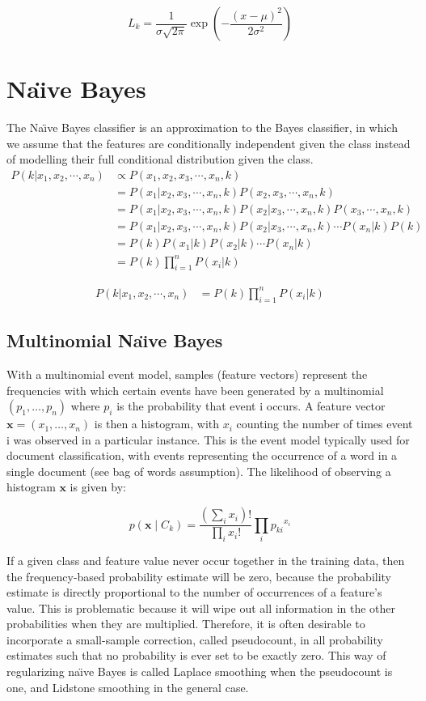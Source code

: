 \documentclass{article}
\begin{document}
\[
L_k = \frac{1}{\sigma\sqrt{2\pi}} \exp \left( -\frac{(x-\mu)^2}{2\sigma^2} \right)
\]

\section{Na\"{\i}ve Bayes}
The Na\"{\i}ve Bayes classifier is an approximation to the Bayes classifier, in which we assume that the features are conditionally independent given the class instead of modelling their full conditional distribution given the class.
\begin{align*} 
P(k|x_1,x_2,\cdots,x_n) &\propto  P(x_1,x_2,x_3,\cdots,x_n,k) \\ 
&=  P(x_1|x_2,x_3,\cdots,x_n,k)P(x_2,x_3,\cdots,x_n,k) \\ 
&= P(x_1|x_2,x_3,\cdots,x_n,k)P(x_2|x_3,\cdots,x_n,k)P(x_3,\cdots,x_n,k) \\
&=  P(x_1|x_2,x_3,\cdots,x_n,k)P(x_2|x_3,\cdots,x_n,k) \cdots P(x_n|k)P(k) \\ 
&=  P(k)P(x_1|k)P(x_2|k) \cdots P(x_n|k) \\
&=  P(k)\prod_{i=1}^{n} P(x_i|k)
\end{align*}

\begin{align*} 
P(k|x_1,x_2,\cdots,x_n) &= P(k)\prod_{i=1}^{n} P(x_i|k)
\end{align*}

\subsection{Multinomial Na\"{\i}ve Bayes}
With a multinomial event model, samples (feature vectors) represent the frequencies with which certain events have been generated by a multinomial  $(p_1,\dots,p_n)$ where $p_i$ is the probability that event i occurs. A feature vector $\mathbf {x}=(x_{1},\dots ,x_{n})$ is then a histogram, with $x_{i}$ counting the number of times event i was observed in a particular instance. This is the event model typically used for document classification, with events representing the occurrence of a word in a single document (see bag of words assumption). The likelihood of observing a histogram $\mathbf{x}$ is given by:

\[
p(\mathbf {x} \mid C_{k}) = {\frac {(\sum _{i}x_{i})!}{\prod _{i}x_{i}!}} \prod _{i}{p_{ki}}^{x_{i}}
\]

If a given class and feature value never occur together in the training data, then the frequency-based probability estimate will be zero, because the probability estimate is directly proportional to the number of occurrences of a feature's value. This is problematic because it will wipe out all information in the other probabilities when they are multiplied. Therefore, it is often desirable to incorporate a small-sample correction, called pseudocount, in all probability estimates such that no probability is ever set to be exactly zero. This way of regularizing na\"{\i}ve Bayes is called Laplace smoothing when the pseudocount is one, and Lidstone smoothing in the general case.
\end{document}
